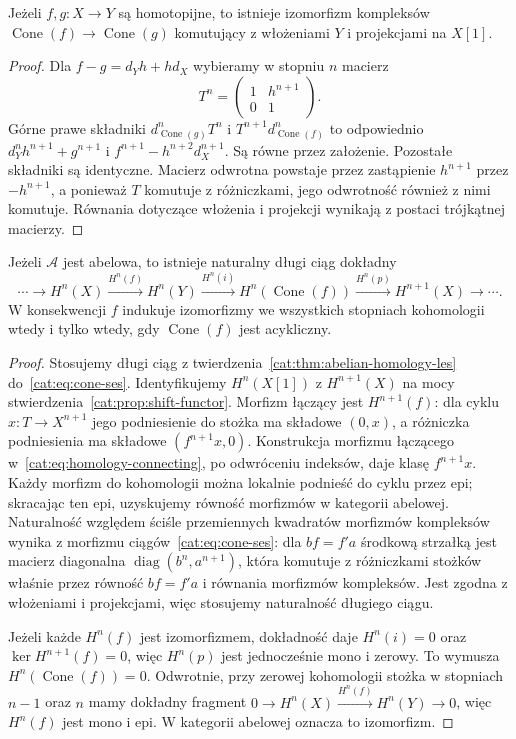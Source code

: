 \begin{stwierdzenie}\label{cat:prop:cone-homotopic}
Jeżeli $f,g:X\to Y$ są homotopijne, to istnieje izomorfizm kompleksów $\operatorname{Cone}(f)\to\operatorname{Cone}(g)$ komutujący z włożeniami $Y$ i projekcjami na $X[1]$.
\end{stwierdzenie}
\begin{proof}
Dla $f-g=d_Yh+hd_X$ wybieramy w stopniu $n$ macierz
\[
 T^n=\begin{pmatrix}1&h^{n+1}\\0&1\end{pmatrix}.
\]
Górne prawe składniki $d_{\operatorname{Cone}(g)}^nT^n$ i $T^{n+1}d_{\operatorname{Cone}(f)}^n$ to odpowiednio $d_Y^nh^{n+1}+g^{n+1}$ i $f^{n+1}-h^{n+2}d_X^{n+1}$. Są równe przez założenie. Pozostałe składniki są identyczne. Macierz odwrotna powstaje przez zastąpienie $h^{n+1}$ przez $-h^{n+1}$, a ponieważ $T$ komutuje z różniczkami, jego odwrotność również z nimi komutuje. Równania dotyczące włożenia i projekcji wynikają z postaci trójkątnej macierzy.
\end{proof}
\begin{twierdzenie}\label{cat:thm:cone-les}
Jeżeli $\mathcal A$ jest abelowa, to istnieje naturalny długi ciąg dokładny
\[
 \cdots\to H^n(X)\xrightarrow{H^n(f)}H^n(Y)
 \xrightarrow{H^n(i)}H^n(\operatorname{Cone}(f))
 \xrightarrow{H^n(p)}H^{n+1}(X)\to\cdots.
\]
W konsekwencji $f$ indukuje izomorfizmy we wszystkich stopniach kohomologii wtedy i tylko wtedy, gdy $\operatorname{Cone}(f)$ jest acykliczny.
\end{twierdzenie}
\begin{proof}
Stosujemy długi ciąg z twierdzenia~\ref{cat:thm:abelian-homology-les} do~\eqref{cat:eq:cone-ses}. Identyfikujemy $H^n(X[1])$ z $H^{n+1}(X)$ na mocy stwierdzenia~\ref{cat:prop:shift-functor}. Morfizm łączący jest $H^{n+1}(f)$: dla cyklu $x:T\to X^{n+1}$ jego podniesienie do stożka ma składowe $(0,x)$, a różniczka podniesienia ma składowe $(f^{n+1}x,0)$. Konstrukcja morfizmu łączącego w~\eqref{cat:eq:homology-connecting}, po odwróceniu indeksów, daje klasę $f^{n+1}x$. Każdy morfizm do kohomologii można lokalnie podnieść do cyklu przez epi; skracając ten epi, uzyskujemy równość morfizmów w kategorii abelowej. Naturalność względem ściśle przemiennych kwadratów morfizmów kompleksów wynika z morfizmu ciągów~\eqref{cat:eq:cone-ses}: dla $bf=f'a$ środkową strzałką jest macierz diagonalna $\operatorname{diag}(b^n,a^{n+1})$, która komutuje z różniczkami stożków właśnie przez równość $bf=f'a$ i równania morfizmów kompleksów. Jest zgodna z włożeniami i projekcjami, więc stosujemy naturalność długiego ciągu.

Jeżeli każde $H^n(f)$ jest izomorfizmem, dokładność daje $H^n(i)=0$ oraz $\ker H^{n+1}(f)=0$, więc $H^n(p)$ jest jednocześnie mono i zerowy. To wymusza $H^n(\operatorname{Cone}(f))=0$. Odwrotnie, przy zerowej kohomologii stożka w stopniach $n-1$ oraz $n$ mamy dokładny fragment $0\to H^n(X)\xrightarrow{H^n(f)}H^n(Y)\to0$, więc $H^n(f)$ jest mono i epi. W kategorii abelowej oznacza to izomorfizm.
\end{proof}
